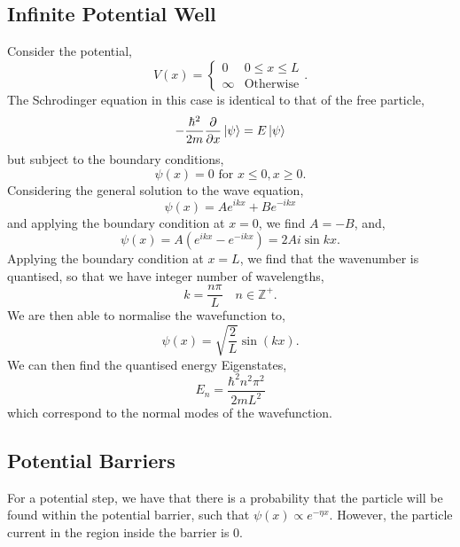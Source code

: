 \documentclass{book}
\begin{document}
\subsection{Infinite Potential Well}
Consider the potential,
\begin{equation}
	V(x) = \begin{cases}
		0 & 0 \leq x \leq L \\
		\infty & \text{Otherwise}
	\end{cases}.
\end{equation}
The Schrodinger equation in this case is identical to that of the free particle,
\begin{equation}
	-\frac{\hbar^2}{2m}\pdv{x}\ket{\psi} = E\ket{\psi}
\end{equation}
but subject to the boundary conditions,
\begin{equation}
	\psi(x) = 0 \text{ for } x \leq 0, x \geq 0.
\end{equation}
Considering the general solution to the wave equation,
\begin{equation}
	\psi(x) = Ae^{ikx} + Be^{-ikx}
\end{equation}
and applying the boundary condition at $x=0$, we find $A = -B$, and,
\begin{equation}
	\psi(x) = A(e^{ikx} - e^{-ikx}) = 2Ai\sin{kx}.
\end{equation}
Applying the boundary condition at $x = L$, we find that the wavenumber is quantised, so that we have integer number of wavelengths,
\begin{equation}
	k = \frac{n\pi}{L} \hspace{1em} n \in \mathbb{Z}^+.
\end{equation}
We are then able to normalise the wavefunction to,
\begin{equation}
	\psi(x) = \sqrt{\frac{2}{L}}\sin(kx).
\end{equation}
We can then find the quantised energy Eigenstates,
\begin{equation}
	E_n = \frac{\hbar^2 n^2 \pi^2}{2mL^2}
\end{equation}
which correspond to the normal modes of the wavefunction.
\subsection{Potential Barriers}
For a potential step, we have that there is a probability that the particle will be found within the potential barrier, such that $\psi(x) \propto e^{-\eta x}$. However, the particle current in the region inside the barrier is 0. 
\end{document}
